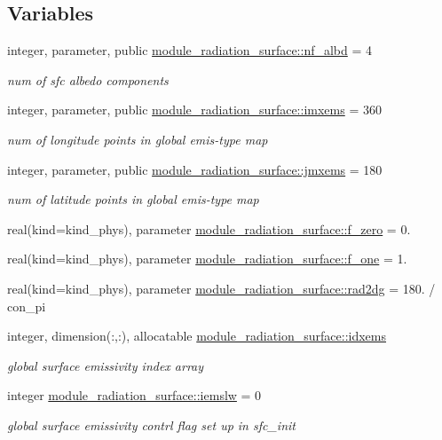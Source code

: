 \subsection*{Variables}
\begin{DoxyCompactItemize}
\item 
integer, parameter, public \hyperlink{group__module__radiation__surface_gab7800982c900bd632ca74d5e7d2b5ab3}{module\+\_\+radiation\+\_\+surface\+::nf\+\_\+albd} = 4
\begin{DoxyCompactList}\small\item\em num of sfc albedo components \end{DoxyCompactList}\item 
integer, parameter, public \hyperlink{group__module__radiation__surface_gaab4b9853c71ff40f8db2aa78b7cab265}{module\+\_\+radiation\+\_\+surface\+::imxems} = 360
\begin{DoxyCompactList}\small\item\em num of longitude points in global emis-\/type map \end{DoxyCompactList}\item 
integer, parameter, public \hyperlink{group__module__radiation__surface_ga3922674f1c727d517ba5b0f7f5093970}{module\+\_\+radiation\+\_\+surface\+::jmxems} = 180
\begin{DoxyCompactList}\small\item\em num of latitude points in global emis-\/type map \end{DoxyCompactList}\item 
real(kind=kind\+\_\+phys), parameter \hyperlink{group__module__radiation__surface_ga86e4f42e46e188303b9a8e4d503d1acb}{module\+\_\+radiation\+\_\+surface\+::f\+\_\+zero} = 0.
\item 
real(kind=kind\+\_\+phys), parameter \hyperlink{group__module__radiation__surface_ga91cec823f595387c92d659d89f307f42}{module\+\_\+radiation\+\_\+surface\+::f\+\_\+one} = 1.
\item 
real(kind=kind\+\_\+phys), parameter \hyperlink{group__module__radiation__surface_gab879c7cf4e0774089a626e54226e4c1b}{module\+\_\+radiation\+\_\+surface\+::rad2dg} = 180. / con\+\_\+pi
\item 
integer, dimension(\+:,\+:), allocatable \hyperlink{group__module__radiation__surface_gac33f1f3441f8336d7eb7e15cba26caf7}{module\+\_\+radiation\+\_\+surface\+::idxems}
\begin{DoxyCompactList}\small\item\em global surface emissivity index array \end{DoxyCompactList}\item 
integer \hyperlink{group__module__radiation__surface_ga3ceebb99dbffcb70a14cfcaa7b029abc}{module\+\_\+radiation\+\_\+surface\+::iemslw} = 0
\begin{DoxyCompactList}\small\item\em global surface emissivity contrl flag set up in \textquotesingle{}sfc\+\_\+init\textquotesingle{} \end{DoxyCompactList}\end{DoxyCompactItemize}

